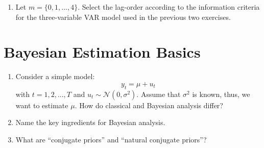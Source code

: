 \documentclass[a4paper]{scrartcl}
\begin{document}
\begin{enumerate}
\begin{solution}
	\end{solution}
	\item Let $m=\{0,1,...,4\}$. Select the lag-order according to the information criteria for the three-variable VAR model used in the previous two exercises.
	\begin{solution}
	\end{solution}
\end{enumerate}

\section{Bayesian Estimation Basics}
\begin{enumerate}
	\item Consider a simple model:
	$$y_t = \mu + u_t$$
	with $t = 1, 2,..., T$ and $u_t \sim \mathcal{N}(0,\sigma^2)$. Assume that $\sigma^2$ is known, thus, we want to estimate $\mu$. How do classical and Bayesian analysis differ?
	\item Name the key ingredients for Bayesian analysis.
	\item What are \enquote{conjugate priors} and \enquote{natural conjugate priors}?
	
\end{enumerate}
\newpage
\end{document}
